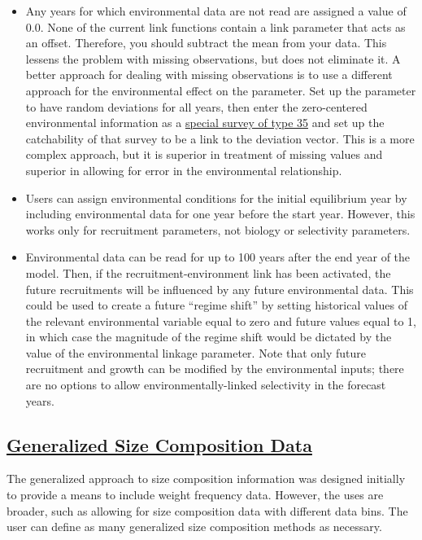 \begin{itemize}
	\item Any years for which environmental data are not read are assigned a value of 0.0. None of the current link functions contain a link parameter that acts as an offset. Therefore, you should subtract the mean from your data. This lessens the problem with missing observations, but does not eliminate it. A better approach for dealing with missing observations is to use a different approach for the environmental effect on the parameter. Set up the parameter to have random deviations for all years, then enter the zero-centered environmental information as a \hyperlink{SpecialSurvey}{special survey of type 35} and set up the catchability of that survey to be a link to the deviation vector. This is a more complex approach, but it is superior in treatment of missing values and superior in allowing for error in the environmental relationship.
	\item Users can assign environmental conditions for the initial equilibrium year by including environmental data for one year before the start year. However, this works only for recruitment parameters, not biology or selectivity parameters.
	\item Environmental data can be read for up to 100 years after the end year of the model. Then, if the recruitment-environment link has been activated, the future recruitments will be influenced by any future environmental data. This could be used to create a future ``regime shift'' by setting historical values of the relevant environmental variable equal to zero and future values equal to 1, in which case the magnitude of the regime shift would be dictated by the value of the environmental linkage parameter. Note that only future recruitment and growth can be modified by the environmental inputs; there are no options to allow environmentally-linked selectivity in the forecast years.
\end{itemize}

\hypertarget{GenSizeComp}{}
\subsection[Generalized Size Composition Data]{\protect\hyperlink{GenSizeComp}{Generalized Size Composition Data}}
The generalized approach to size composition information was designed initially to provide a means to include weight frequency data. However, the uses are broader, such as allowing for size composition data with different data bins. The user can define as many generalized size composition methods as necessary.

